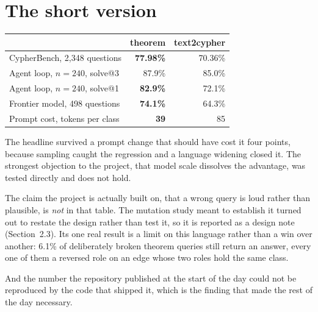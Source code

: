 \documentclass[11pt]{article}
\begin{document}
\section{The short version}

\begin{center}
\begin{tabular}{lrr}
\toprule
 & theorem & text2cypher \\
\midrule
CypherBench, 2{,}348 questions      & \textbf{77.98\%} & 70.36\% \\
Agent loop, $n=240$, solve@3        & 87.9\% & 85.0\% \\
Agent loop, $n=240$, solve@1        & \textbf{82.9\%} & 72.1\% \\
Frontier model, 498 questions       & \textbf{74.1\%} & 64.3\% \\
Prompt cost, tokens per class       & \textbf{39} & 85 \\
\bottomrule
\end{tabular}
\end{center}

\vspace{0.6em}

The headline survived a prompt change that should have cost it four points,
because sampling caught the regression and a language widening closed it. The
strongest objection to the project, that model scale dissolves the advantage, was
tested directly and does not hold.

The claim the project is actually built on, that a wrong query is loud rather
than plausible, is \emph{not} in that table. The mutation study meant to
establish it turned out to restate the design rather than test it, so it is
reported as a design note (Section~2.3). Its one real result is a limit on this
language rather than a win over another: 6.1\% of deliberately broken theorem
queries still return an answer, every one of them a reversed role on an edge
whose two roles hold the same class.

And the number the repository published at the start of the day could not be
reproduced by the code that shipped it, which is the finding that made the rest
of the day necessary.
\end{document}
